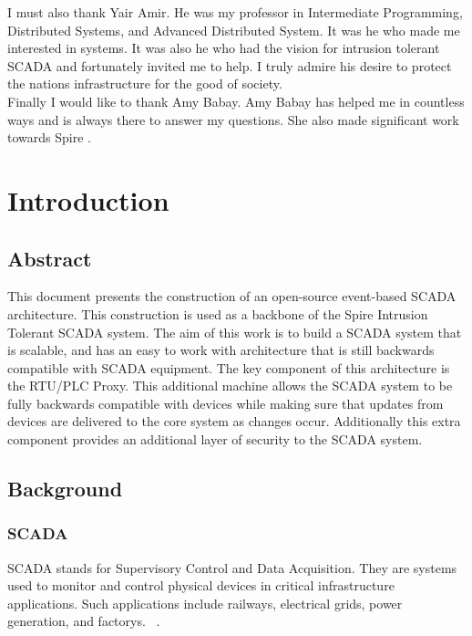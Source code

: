 \documentclass[11pt,a4paper,oldfontcommands]{memoir}
\begin{document}
\indent I must also thank Yair Amir. He was my professor in Intermediate Programming, 
Distributed Systems, and Advanced Distributed System. It was he who made me
interested in systems. It was also he who had the vision for intrusion tolerant
SCADA and fortunately invited me to help. I truly admire his desire to
protect the nations infrastructure for the good of society. \\

\indent Finally I would like to thank Amy Babay. Amy Babay has helped me in countless ways
and is always there to answer my questions. She also made significant work towards
Spire .
\clearpage
\tableofcontents*

\clearpage


\chapter{Introduction}

\section{Abstract}

\indent \indent This document presents the construction of an open-source event-based SCADA 
architecture. This construction is used as a backbone of the Spire Intrusion Tolerant
SCADA system. The aim of this work is to build a SCADA system that is scalable, and has an 
easy to work with architecture that is still backwards compatible with
SCADA equipment. The key component of this architecture is the RTU/PLC Proxy. This additional 
machine allows the SCADA system to be fully backwards compatible with devices while
making sure that updates from devices are delivered to the core system as changes occur.
Additionally this extra component provides an additional layer of security to the SCADA
system.

\section{Background}

\subsection{SCADA}

\indent \indent SCADA stands for Supervisory Control and Data Acquisition. 
They are systems used 
to monitor and control physical devices in critical infrastructure applications.
Such applications include railways, electrical grids, power generation,
and factorys. ~\cite{SCADA in the Light of Cyber Warfare}. \\
\end{document}
